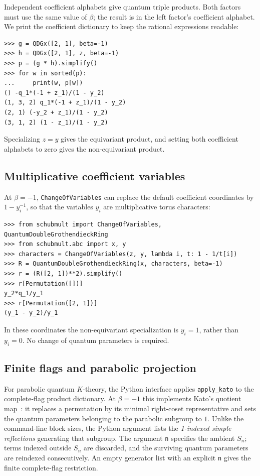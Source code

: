 \documentclass{amsart}
\theoremstyle{definition}
\theoremstyle{remark}
\numberwithin{equation}{section}
\begin{document}
Independent coefficient alphabets give quantum triple products.
Both factors must use the same value of $\beta$; the result is in the
left factor's coefficient alphabet. We print the coefficient dictionary
to keep the rational expressions readable:
\begin{verbatim}
>>> g = QDGx([2, 1], beta=-1)
>>> h = QDGx([2, 1], z, beta=-1)
>>> p = (g * h).simplify()
>>> for w in sorted(p):
...     print(w, p[w])
() -q_1*(-1 + z_1)/(1 - y_2)
(1, 3, 2) q_1*(-1 + z_1)/(1 - y_2)
(2, 1) (-y_2 + z_1)/(1 - y_2)
(3, 1, 2) (1 - z_1)/(1 - y_2)
\end{verbatim}
Specializing $z=y$ gives the equivariant product, and setting both
coefficient alphabets to zero gives the non-equivariant product.

\subsection{Multiplicative coefficient variables}

At $\beta=-1$, \texttt{ChangeOfVariables} can replace the default
coefficient coordinates by $1-y_i^{-1}$, so that the variables $y_i$
are multiplicative torus characters:
\begin{verbatim}
>>> from schubmult import ChangeOfVariables, QuantumDoubleGrothendieckRing
>>> from schubmult.abc import x, y
>>> characters = ChangeOfVariables(z, y, lambda i, t: 1 - 1/t[i])
>>> R = QuantumDoubleGrothendieckRing(x, characters, beta=-1)
>>> r = (R([2, 1])**2).simplify()
>>> r[Permutation([])]
y_2*q_1/y_1
>>> r[Permutation([2, 1])]
(y_1 - y_2)/y_1
\end{verbatim}
In these coordinates the non-equivariant specialization is $y_i=1$,
rather than $y_i=0$. No change of quantum parameters is required.

\subsection{Finite flags and parabolic projection}

For parabolic quantum $K$-theory, the Python interface applies
\texttt{apply\_kato} to the complete-flag product dictionary.
At $\beta=-1$ this implements Kato's quotient
map~\cite{kato2019quantum}: it replaces a permutation by its minimal
right-coset representative and sets the quantum parameters belonging
to the parabolic subgroup to $1$.
Unlike the command-line block sizes, the Python argument lists the
\emph{1-indexed simple reflections} generating that subgroup.
The argument \texttt{n} specifies the ambient $S_n$; terms indexed
outside $S_n$ are discarded, and the surviving quantum parameters
are reindexed consecutively. An empty generator list with an explicit
\texttt{n} gives the finite complete-flag restriction.
\end{document}
